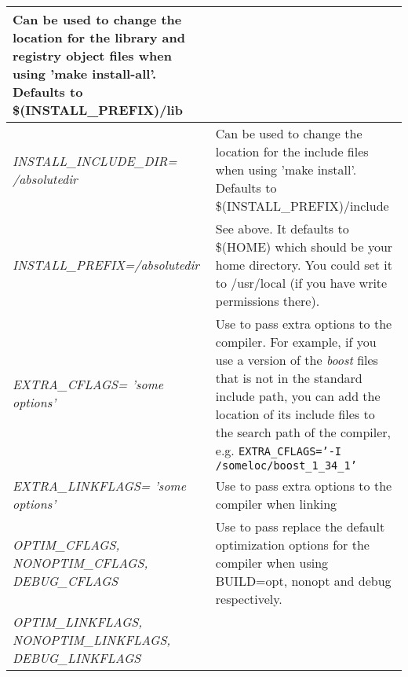 \documentclass{article}
\begin{document}
\begin{longtable}{|p{\MakeTableFirstCol}|p{\MakeTableSecondCol}|}
{\raggedright
Can be used to change the location for the library and registry 
object files when using 'make install-all'. Defaults to \$(INSTALL\_PREFIX)/lib} \\
\hline

{\raggedright
\textit{INSTALL\_INCLUDE\_DIR= \linebreak
/absolutedir}} & 

{\raggedright
Can be used to change the location for the include files when 
using 'make install'. Defaults to \$(INSTALL\_PREFIX)/include} \\
\hline

{\raggedright
\textit{INSTALL\_PREFIX=/absolutedir}} & 

{\raggedright
See above. It defaults to \$(HOME) which should be your home 
directory. You could set it to /usr/local (if you have write 
permissions there).} \\
\hline

{\raggedright
\textit{EXTRA\_CFLAGS= \linebreak
'some options'}} & 

{\raggedright
Use to pass extra options to the compiler. For example, if you
use a version of the \textit{boost} files that is not in the standard
include path, you can add the location of its include files to the 
search path of the compiler, e.g. \linebreak
\texttt{EXTRA\_CFLAGS='-I /someloc/boost\_1\_34\_1'}} \\
\hline

{\raggedright
\textit{EXTRA\_LINKFLAGS= \linebreak
'some options'}} & 

{\raggedright
Use to pass extra options to the compiler when linking} \\
\hline

{\raggedright
\textit{OPTIM\_CFLAGS, \linebreak
NONOPTIM\_CFLAGS, \linebreak
DEBUG\_CFLAGS}} & 

{\raggedright
Use to pass replace the default optimization options for the compiler when using BUILD=opt, nonopt and debug respectively.} \\
\hline

{\raggedright
\textit{OPTIM\_LINKFLAGS, \linebreak
NONOPTIM\_LINKFLAGS, \linebreak
DEBUG\_LINKFLAGS}} & 


\end{longtable}
\end{document}
